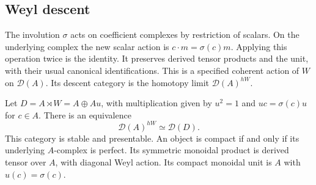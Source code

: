 \subsection{Weyl descent}

The involution $\sigma$ acts on coefficient complexes by restriction of scalars.
On the underlying complex the new scalar action is $c\cdot m=\sigma(c)m$.
Applying this operation twice is the identity.
It preserves derived tensor products and the unit, with their usual canonical identifications.
This is a specified coherent action of $W$ on $\mathcal D(A)$.
Its descent category is the homotopy limit $\mathcal D(A)^{hW}$.

\begin{proposition}
\label{v4-arith:ic:eis:parameter-descent}
Let $D=A\rtimes W=A\oplus Au$, with multiplication given by
$u^2=1$ and $uc=\sigma(c)u$ for $c\in A$.
There is an equivalence
\[
 \mathcal D(A)^{hW}\simeq\mathcal D(D).
\]
This category is stable and presentable.
An object is compact if and only if its underlying $A$-complex is perfect.
Its symmetric monoidal product is derived tensor over $A$, with diagonal Weyl action.
Its compact monoidal unit is $A$ with $u(c)=\sigma(c)$.
\end{proposition}

